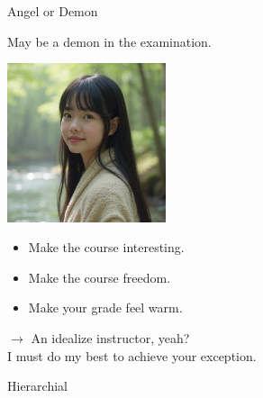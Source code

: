 \documentclass{beamer}
\begin{document}
\begin{frame}{Angel or Demon}
\begin{minipage}{0.4\textwidth}
\begin{center}
\end{center}
\begin{center}
May be a demon in the examination.
\end{center}
\end{minipage}
\end{frame}
\begin{frame}{}
\begin{center}
\includegraphics[width=0.35\textwidth]{tchsiao.png}
\end{center}
\begin{itemize}
\item Make the course interesting.
\item Make the course freedom.
\item Make your grade feel warm.
\end{itemize}
$\rightarrow$ An idealize instructor, yeah? \\
I must do my best to achieve your exception.
\end{frame}
\begin{frame}{Hierarchial}
\begin{center}
\end{center}
\end{frame}
\end{document}
